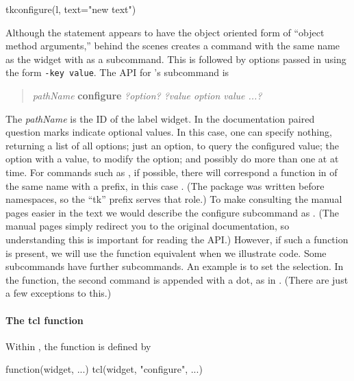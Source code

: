 \begin{Schunk}
\begin{Sinput}
 tkconfigure(l, text="new text")
\end{Sinput}
\end{Schunk}


Although the \TCL\/ statement appears to have the object oriented form
of ``object method arguments,'' behind the scenes \TCL\/ creates a
command with the same name as the widget with  as a
subcommand. This is followed by options passed in using the form
\texttt{-key value}.  The \TK\/ API for 's
 subcommand is

\begin{quotation}
  \textit{pathName} \textbf{configure} \textit{?option? ?value option value ...?}
\end{quotation}

The \textit{pathName} is the ID of the label widget. In the \TK\/ documentation
paired question marks indicate optional values. In this case, one can
specify nothing, returning a list of all options; just an option, to query the configured value; the option
with a value, to modify the option; and possibly do more than one at at time.
For commands such as , if possible, there will correspond a
function in \R\/ of the same name with a  prefix, in this case
.  (The package  was written before
namespaces, so the ``tk'' prefix serves that role.) To make consulting the \TK\/ manual pages easier in the text we would describe the configure subcommand as . (The \R\/ manual pages simply redirect you to the original \TK\/ documentation, so understanding this is important for reading the API.) However, if such a function is present, we will use the \R\/ function equivalent when we illustrate code. Some subcommands have further subcommands. An example is to set the selection. In the \R\/ function, the second command is appended with a dot, as in . (There are just a few exceptions to this.)

\paragraph{The tcl function} Within , the  function is defined by

\begin{Sinput}
function(widget, ...) tcl(widget, "configure", ...)
\end{Sinput}

